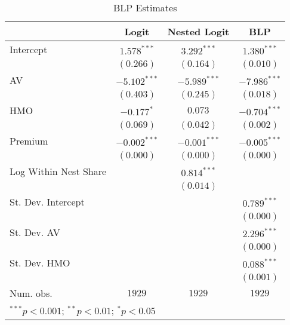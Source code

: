 
\begin{table}
\caption{BLP Estimates}
\begin{center}
\begin{tabular}{l c c c}
\hline
 & Logit & Nested Logit & BLP \\
\hline
Intercept             & $1.578^{***}$  & $3.292^{***}$  & $1.380^{***}$  \\
                      & $(0.266)$      & $(0.164)$      & $(0.010)$      \\
AV                    & $-5.102^{***}$ & $-5.989^{***}$ & $-7.986^{***}$ \\
                      & $(0.403)$      & $(0.245)$      & $(0.018)$      \\
HMO                   & $-0.177^{*}$   & $0.073$        & $-0.704^{***}$ \\
                      & $(0.069)$      & $(0.042)$      & $(0.002)$      \\
Premium               & $-0.002^{***}$ & $-0.001^{***}$ & $-0.005^{***}$ \\
                      & $(0.000)$      & $(0.000)$      & $(0.000)$      \\
Log Within Nest Share &                & $0.814^{***}$  &                \\
                      &                & $(0.014)$      &                \\
St. Dev. Intercept    &                &                & $0.789^{***}$  \\
                      &                &                & $(0.000)$      \\
St. Dev. AV           &                &                & $2.296^{***}$  \\
                      &                &                & $(0.000)$      \\
St. Dev. HMO          &                &                & $0.088^{***}$  \\
                      &                &                & $(0.001)$      \\
\hline
Num. obs.             & $1929$         & $1929$         & $1929$         \\
\hline
\multicolumn{4}{l}{\scriptsize{$^{***}p<0.001$; $^{**}p<0.01$; $^{*}p<0.05$}}
\end{tabular}
\label{table:coefficients}
\end{center}
\end{table}

